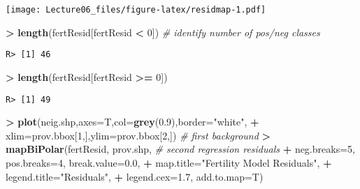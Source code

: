 \documentclass[
]{article}
\newenvironment{Shaded}{\begin{snugshade}}{\end{snugshade}}
\newcommand{\CommentTok}[1]{\textcolor[rgb]{0.56,0.35,0.01}{\textit{#1}}}
\newcommand{\DataTypeTok}[1]{\textcolor[rgb]{0.13,0.29,0.53}{#1}}
\newcommand{\DecValTok}[1]{\textcolor[rgb]{0.00,0.00,0.81}{#1}}
\newcommand{\FloatTok}[1]{\textcolor[rgb]{0.00,0.00,0.81}{#1}}
\newcommand{\KeywordTok}[1]{\textcolor[rgb]{0.13,0.29,0.53}{\textbf{#1}}}
\newcommand{\NormalTok}[1]{#1}
\newcommand{\OperatorTok}[1]{\textcolor[rgb]{0.81,0.36,0.00}{\textbf{#1}}}
\newcommand{\StringTok}[1]{\textcolor[rgb]{0.31,0.60,0.02}{#1}}
\begin{document}
\texttt{[image: Lecture06\_files/figure-latex/residmap-1.pdf]}

\begin{Shaded}
\begin{Highlighting}[]
\OperatorTok{>}\StringTok{ }\KeywordTok{length}\NormalTok{(fertResid[fertResid }\OperatorTok{<}\StringTok{ }\DecValTok{0}\NormalTok{])                         }\CommentTok{# identify number of pos/neg classes}
\end{Highlighting}
\end{Shaded}

\begin{verbatim}
R> [1] 46
\end{verbatim}

\begin{Shaded}
\begin{Highlighting}[]
\OperatorTok{>}\StringTok{ }\KeywordTok{length}\NormalTok{(fertResid[fertResid }\OperatorTok{>=}\StringTok{ }\DecValTok{0}\NormalTok{])}
\end{Highlighting}
\end{Shaded}

\begin{verbatim}
R> [1] 49
\end{verbatim}

\begin{Shaded}
\begin{Highlighting}[]
\OperatorTok{>}\StringTok{ }\KeywordTok{plot}\NormalTok{(neig.shp,}\DataTypeTok{axes=}\NormalTok{T,}\DataTypeTok{col=}\KeywordTok{grey}\NormalTok{(}\FloatTok{0.9}\NormalTok{),}\DataTypeTok{border=}\StringTok{"white"}\NormalTok{,}
\OperatorTok{+}\StringTok{      }\DataTypeTok{xlim=}\NormalTok{prov.bbox[}\DecValTok{1}\NormalTok{,],}\DataTypeTok{ylim=}\NormalTok{prov.bbox[}\DecValTok{2}\NormalTok{,])               }\CommentTok{# first background}
\OperatorTok{>}\StringTok{ }\KeywordTok{mapBiPolar}\NormalTok{(fertResid, prov.shp,                           }\CommentTok{# second regression residuals}
\OperatorTok{+}\StringTok{             }\DataTypeTok{neg.breaks=}\DecValTok{5}\NormalTok{, }\DataTypeTok{pos.breaks=}\DecValTok{4}\NormalTok{, }\DataTypeTok{break.value=}\FloatTok{0.0}\NormalTok{, }
\OperatorTok{+}\StringTok{             }\DataTypeTok{map.title=}\StringTok{"Fertility Model Residuals"}\NormalTok{,}
\OperatorTok{+}\StringTok{             }\DataTypeTok{legend.title=}\StringTok{"Residuals"}\NormalTok{, }
\OperatorTok{+}\StringTok{             }\DataTypeTok{legend.cex=}\FloatTok{1.7}\NormalTok{, }\DataTypeTok{add.to.map=}\NormalTok{T)}
\end{Highlighting}
\end{Shaded}
\end{document}
